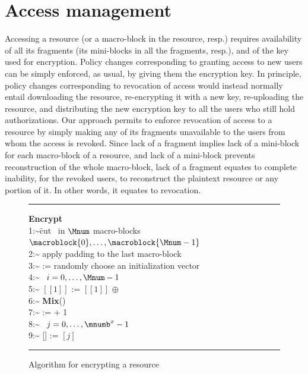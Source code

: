 
\section{Access management}\label{ms:sec:revoke}

Accessing a resource (or a macro-block in the resource, resp.) requires availability of all its fragments (its mini-blocks in all the fragments, resp.), and of the key used for encryption. Policy changes corresponding to granting access to new users can be simply enforced, as usual, by giving them the encryption key. In principle, policy changes corresponding to revocation of access would instead normally entail downloading the resource, re-encrypting it with a new key, re-uploading the resource, and distributing the new encryption key to all the users who still hold authorizations. Our approach permits to enforce revocation of access to a resource by simply making any of its fragments unavailable to the users from whom the access is revoked. Since lack of a fragment implies lack of a mini-block for each macro-block of a resource, and lack of a mini-block prevents reconstruction of the whole macro-block, lack of a fragment equates to complete inability, for the revoked users, to reconstruct the plaintext resource or any portion of it. In other words, it equates to revocation.

\begin{figure}[!t]
\begin{scriptsize}
\hrule          %
\vspace{0.12cm}
\begin{tabbing}
{\bf Encrypt}\\ 
\num{1:~}\= cut \resource\ in $\Mnum$ macro-blocks $\macroblock{0},\ldots,\macroblock{\Mnum-1}$\\
\num{2:~}\1 apply padding to the last macro-block \\
\num{3:~}\1  := randomly choose an initialization vector\\
\num{4:~}\1 \myfor\ $i=0,\ldots,\Mnum-1$  \\
\num{5:~}\2     $[[1]]$ := $[[1]]$ $\oplus$  \\
\num{6:~}\2     {\bf Mix}() \\
\num{7:~}\2      :=  $+$ 1 \\
\num{8:~}\2     \myfor\ $j=0,\ldots,\mnumb^x-1$  \\
\num{9:~}\3         [] := $[j]$
\end{tabbing}
\vspace{-0.3cm}
\hrule
\end{scriptsize}
\caption{\label{ms:fig:algoenc}Algorithm for encrypting a resource \resource}
\end{figure}

